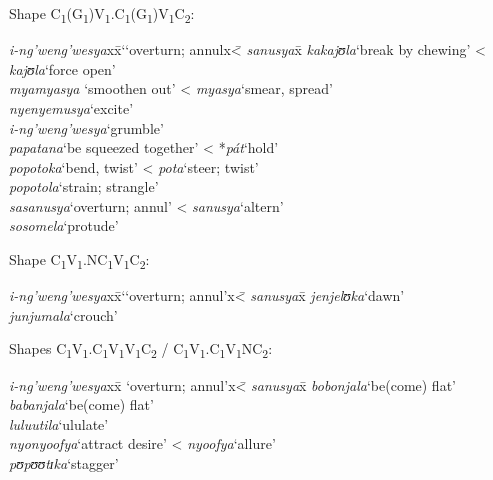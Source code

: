 \begin{exe}
\ex \begin{xlist} \label{exPartieleWithSuffixes}
\ex Shape C\textsubscript{1}(G\textsubscript{1})V\textsubscript{1}.C\textsubscript{1}(G\textsubscript{1})V\textsubscript{1}C\textsubscript{2}:
\begin{tabbing}
\textit{i-ng'weng'wesya}x\=x\lq `overturn; annulx\=< \textit{sanusya}x\=\kill%
\textit{kakajʊla}\>`break by chewing'\> < \textit{kajʊla}\>`force open'\\
\textit{myamyasya}\> \lq smoothen out'\> < \textit{myasya}\>`smear, spread'\\
\textit{nyenyemusya}\>`excite'\\
\textit{i-ng'weng'wesya}\>`grumble'\\
\textit{papatana}\>`be squeezed together'\> < *\textit{pát}\>`hold'\\
\textit{popotoka}\>`bend, twist'\> < \textit{pota}\>`steer; twist'\\
\textit{popotola}\>`strain; strangle'\\
\textit{sasanusya}\>`overturn; annul'\> <
\textit{sanusya}\>\lq altern'\\
\textit{sosomela}\>`protude'
\end{tabbing}
\ex Shape C\textsubscript{1}V\textsubscript{1}.NC\textsubscript{1}V\textsubscript{1}C\textsubscript{2}:
\begin{tabbing}
\textit{i-ng'weng'wesya}x\=x\lq `overturn; annul'x\=< \textit{sanusya}x\=\kill%
\textit{jenjelʊka}\>`dawn'\\
\textit{junjumala}\>`crouch'
\end{tabbing}
\ex Shapes C\textsubscript{1}V\textsubscript{1}.C\textsubscript{1}V\textsubscript{1}V\textsubscript{1}C\textsubscript{2} / C\textsubscript{1}V\textsubscript{1}.C\textsubscript{1}V\textsubscript{1}NC\textsubscript{2}:
\begin{tabbing}
\textit{i-ng'weng'wesya}x\=x `overturn; annul'x\=< \textit{sanusya}x\=\kill%
\textit{bobonjala}\>`be(come) flat'\\
\textit{babanjala}\>`be(come) flat'\\
\textit{luluutila}\>\lq ululate'\\
\textit{nyonyoofya}\>`attract desire'\> < \textit{nyoofya}\>`allure'\\
\textit{pʊpʊʊtɪka}\>`stagger'
\end{tabbing}
\end{xlist}
\end{exe}
